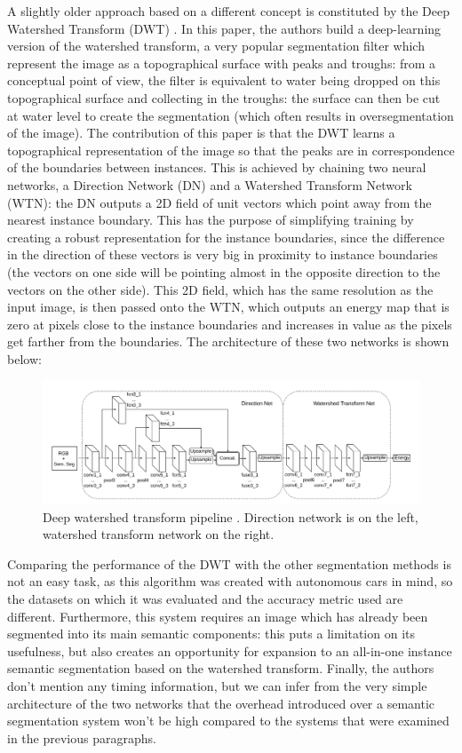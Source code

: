 \documentclass[12pt,twoside]{report}
\begin{document}
A slightly older approach based on a different concept is constituted by the Deep Watershed Transform (DWT) \cite{deepwatershed}. In this paper, the authors build a deep-learning version of the watershed transform, a very popular segmentation filter which represent the image as a topographical surface with peaks and troughs: from a conceptual point of view, the filter is equivalent to water being dropped on this topographical surface and collecting in the troughs: the surface can then be cut at water level to create the segmentation (which often results in oversegmentation of the image). The contribution of this paper is that the DWT learns a topographical representation of the image so that the peaks are in correspondence of the boundaries between instances. This is achieved by chaining two neural networks, a Direction Network (DN) and a Watershed Transform Network (WTN): the DN outputs a 2D field of unit vectors which point away from the nearest instance boundary. This has the purpose of simplifying training by creating a robust representation for the instance boundaries, since the difference in the direction of these vectors is very big in proximity to instance boundaries (the vectors on one side will be pointing almost in the opposite direction to the vectors on the other side). This 2D field, which has the same resolution as the input image, is then passed onto the WTN, which outputs an energy map that is zero at pixels close to the instance boundaries and increases in value as the pixels get farther from the boundaries. The architecture of these two networks is shown below:
\\

\begin{figure}[ht]%
\centering
\includegraphics[width = 0.74\hsize]{./figures/dwt}
\caption{Deep watershed transform pipeline \cite{deepwatershed}. Direction network is on the left, watershed transform network on the right.}
\label{fig:dwt}
\end{figure}

Comparing the performance of the DWT with the other segmentation methods is not an easy task, as this algorithm was created with autonomous cars in mind, so the datasets on which it was evaluated and the accuracy metric used are different. Furthermore, this system requires an image which has already been segmented into its main semantic components: this puts a limitation on its usefulness, but also creates an opportunity for expansion to an all-in-one instance semantic segmentation based on the watershed transform. Finally, the authors don't mention any timing information, but we can infer from the very simple architecture of the two networks that the overhead introduced over a semantic segmentation system won't be high compared to the systems that were examined in the previous paragraphs.
\end{document}
